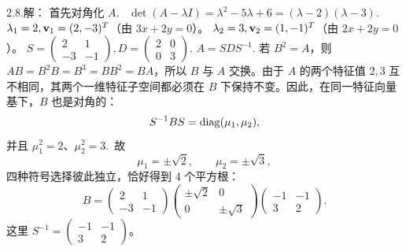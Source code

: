 \begin{exer}
2.8.解：
首先对角化 $A$.~
$\det(A-\lambda I) = \lambda^2 - 5\lambda + 6 = (\lambda-2)(\lambda-3)$.~
$\lambda_1 = 2, \mathbf{v}_1 = (2, -3)^T$（由 $3x+2y=0$）。
$\lambda_2 = 3, \mathbf{v}_2 = (1, -1)^T$（由 $2x+2y=0$）。
$S = \begin{pmatrix} 2 & 1 \\ -3 & -1 \end{pmatrix}, D = \begin{pmatrix} 2 & 0 \\ 0 & 3 \end{pmatrix}$.
$A = S D S^{-1}$.
若 $B^2=A$，则 $AB=B^2B=B^3=BB^2=BA$，所以 $B$ 与 $A$ 交换。由于 $A$ 的两个特征值 $2,3$ 互不相同，其两个一维特征子空间都必须在 $B$ 下保持不变。因此，在同一特征向量基下，$B$ 也是对角的：
$$S^{-1}BS=\operatorname{diag}(\mu_1,\mu_2),$$
并且 $\mu_1^2=2$、$\mu_2^2=3$.~故
$$\mu_1=\pm\sqrt2,\qquad \mu_2=\pm\sqrt3,$$
四种符号选择彼此独立，恰好得到 4 个平方根：
$$ B = \begin{pmatrix} 2 & 1 \\ -3 & -1 \end{pmatrix} \begin{pmatrix} \pm\sqrt{2} & 0 \\ 0 & \pm\sqrt{3} \end{pmatrix} \begin{pmatrix} -1 & -1 \\ 3 & 2 \end{pmatrix}. $$
这里 $S^{-1}=\begin{pmatrix}-1&-1\\3&2\end{pmatrix}$。


\end{exer}
